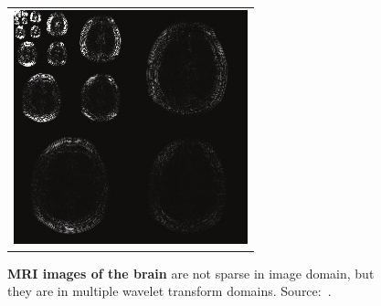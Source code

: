 \begin{figure}[htbp]
\begin{minipage}[t]{0.31\linewidth}
\begin{tabular}{c}
            \\ 
            \includegraphics[width=0.65\linewidth]{images/brain_MRI_wavelet.png}
        \end{tabular}
        \caption{\textbf{MRI images of the brain} are not sparse in image domain, but they are in multiple wavelet transform domains. Source:~\cite{zhao_compressed_2014}.}
        \label{fig:brain_wavelet}
    \end{minipage}
\end{figure}

